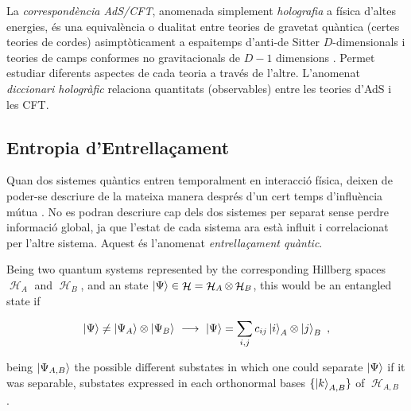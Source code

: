 \documentclass[lettersize,journal]{IEEEtran}
\providecommand{\eq}[2]{
    \begin{equation}
        #2
    \label{eq:#1}
    \end{equation}
}
\DeclareMathOperator{\calH}{\mathcal{H}}
\begin{document}
La \textit{correspondència AdS/CFT}, anomenada simplement \textit{holografia} a física d'altes energies, és una equivalència o dualitat entre teories de gravetat quàntica (certes teories de cordes) asimptòticament a espaitemps d'anti-de Sitter $D$-dimensionals i teories de camps conformes no gravitacionals de $D-1$ dimensions \cite{maldacena_large_1999}. Permet estudiar diferents aspectes de cada teoria a través de l'altre. L'anomenat \textit{diccionari hologràfic} relaciona quantitats (observables) entre les teories d'AdS i les CFT.


\subsection{Entropia d'Entrellaçament}

Quan dos sistemes quàntics entren temporalment en interacció física, deixen de poder-se descriure de la mateixa manera després d'un cert temps d'influència mútua \cite{schrodinger_discussion_1935}. No es podran descriure cap dels dos sistemes per separat sense perdre informació global, ja que l'estat de cada sistema ara està influit i correlacionat per l'altre sistema. Aquest és l'anomenat \textit{entrellaçament quàntic}.

Being two quantum systems represented by the corresponding Hillberg spaces $\calH_A$ and $\calH_B$, and an state $\ket{\Psi} \in \calH = \calH_A \otimes \calH_B$, this would be an entangled state if
\eq{entanglement}{
    \ket{\Psi} \neq \ket{\Psi_A} \otimes \ket{\Psi_B} \ \longrightarrow \ \ket{\Psi} = \sum_{i,j} c_{ij} \ket{i}_A \otimes \ket{j}_B \ ,
}
being $\ket{\Psi_{A,B}}$ the possible different substates in which one could separate $\ket{\Psi}$ if it was separable, substates expressed in each orthonormal bases $\{ \ket{k}_{A,B} \}$ of $\calH_{A,B}$ \cite{}.
\end{document}
